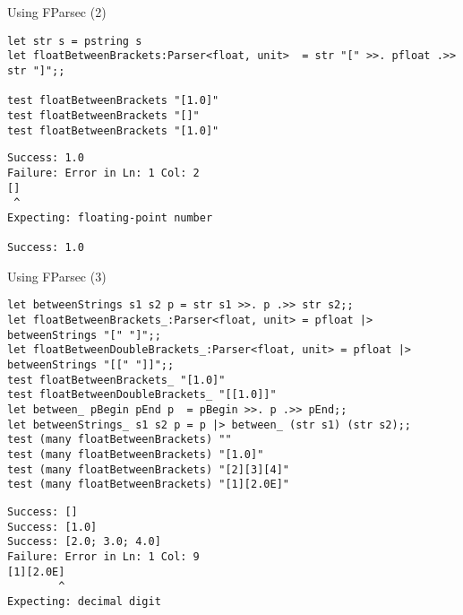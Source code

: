 \documentclass[t]{beamer}
\begin{document}
\begin{frame}[label={sec:orgbb4ff9b},fragile]{Using FParsec (2)}
 \begin{verbatim}
let str s = pstring s
let floatBetweenBrackets:Parser<float, unit>  = str "[" >>. pfloat .>> str "]";;

test floatBetweenBrackets "[1.0]"
test floatBetweenBrackets "[]"
test floatBetweenBrackets "[1.0]"
\end{verbatim}

\begin{verbatim}
Success: 1.0
Failure: Error in Ln: 1 Col: 2
[]
 ^
Expecting: floating-point number

Success: 1.0
\end{verbatim}
\end{frame}

\begin{frame}[label={sec:org66aa7ee},fragile]{Using FParsec (3)}
 \begin{verbatim}
let betweenStrings s1 s2 p = str s1 >>. p .>> str s2;;
let floatBetweenBrackets_:Parser<float, unit> = pfloat |> betweenStrings "[" "]";;
let floatBetweenDoubleBrackets_:Parser<float, unit> = pfloat |> betweenStrings "[[" "]]";;
test floatBetweenBrackets_ "[1.0]"
test floatBetweenDoubleBrackets_ "[[1.0]]"
let between_ pBegin pEnd p  = pBegin >>. p .>> pEnd;;
let betweenStrings_ s1 s2 p = p |> between_ (str s1) (str s2);;
test (many floatBetweenBrackets) ""
test (many floatBetweenBrackets) "[1.0]"
test (many floatBetweenBrackets) "[2][3][4]"
test (many floatBetweenBrackets) "[1][2.0E]"
\end{verbatim}

\begin{verbatim}
Success: []
Success: [1.0]
Success: [2.0; 3.0; 4.0]
Failure: Error in Ln: 1 Col: 9
[1][2.0E]
        ^
Expecting: decimal digit

\end{verbatim}
\end{frame}
\end{document}
